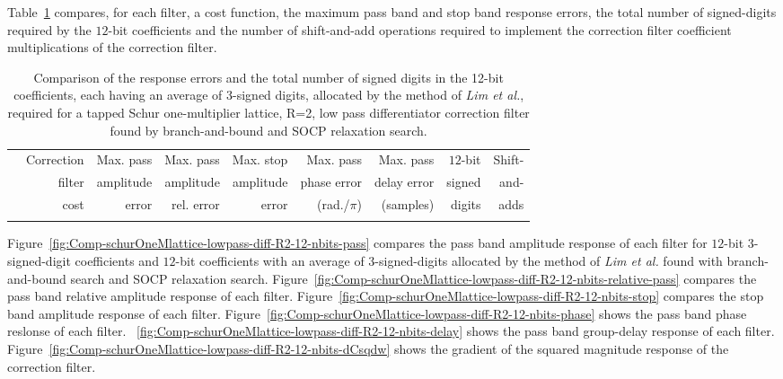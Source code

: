 \documentclass[a4paper,twoside,10pt,english]{article}
\begin{document}
Table~\ref{tab:Comp-schurOneMlattice-lowpass-diff-R2-12-nbits-cost}
compares, for each filter, a cost function, the maximum pass band and stop band
response errors, the total number of signed-digits required by the $12$-bit 
coefficients and the number of shift-and-add operations required to implement
the correction filter coefficient multiplications of the correction filter.

\begin{table}
\centering
\begin{threeparttable}
\begin{tabular}{lrrrrrrrr} \\ \toprule
 &Correction&Max. pass&Max. pass &Max. stop &Max. pass   &Max. pass  &$12$-bit&Shift-\\
 &filter    &amplitude&amplitude &amplitude &phase error &delay error&signed  &and- \\
 &cost      &error    &rel. error&error     &(rad./$\pi$)&(samples)  &digits  &adds \\
\midrule

\\ \bottomrule
\end{tabular}
\end{threeparttable}
\caption[Comparison of low pass differentiator filter fixed point implementations]
{Comparison of the response errors and the total number of signed digits in the
  12-bit coefficients, each having an average of 3-signed digits, allocated by
  the method of \emph{Lim et al.}, required for a tapped Schur one-multiplier
  lattice, R=2, low pass differentiator correction filter found by
  branch-and-bound and SOCP relaxation search.}
\label{tab:Comp-schurOneMlattice-lowpass-diff-R2-12-nbits-cost}
\end{table}

Figure~\ref{fig:Comp-schurOneMlattice-lowpass-diff-R2-12-nbits-pass}
compares the pass band amplitude response of each filter for
$12$-bit $3$-signed-digit coefficients and $12$-bit coefficients with an average
of $3$-signed-digits allocated by the method of \emph{Lim et al.} found with
branch-and-bound search and SOCP relaxation search.
Figure~\ref{fig:Comp-schurOneMlattice-lowpass-diff-R2-12-nbits-relative-pass}
compares the pass band relative amplitude response of each filter.
Figure~\ref{fig:Comp-schurOneMlattice-lowpass-diff-R2-12-nbits-stop}
compares the stop band amplitude response of each filter.
Figure~\ref{fig:Comp-schurOneMlattice-lowpass-diff-R2-12-nbits-phase} shows
the pass band phase reslonse of each filter.
~\ref{fig:Comp-schurOneMlattice-lowpass-diff-R2-12-nbits-delay} shows the
pass band group-delay response of each filter.
Figure~\ref{fig:Comp-schurOneMlattice-lowpass-diff-R2-12-nbits-dCsqdw} shows
the gradient of the squared magnitude response of the correction filter.
\end{document}
